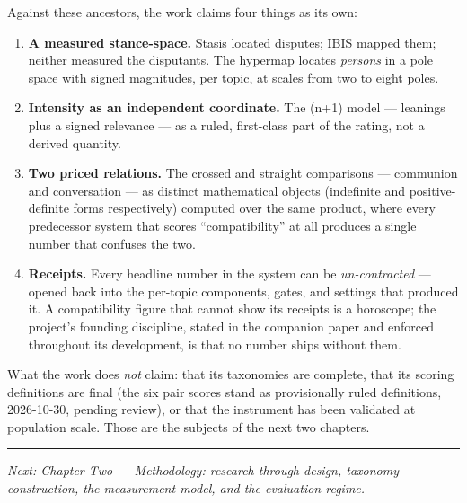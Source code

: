 Against these ancestors, the work claims four things as its own:

\begin{enumerate}
\def\labelenumi{\arabic{enumi}.}
\tightlist
\item
  \textbf{A measured stance-space.} Stasis located disputes; IBIS mapped
  them; neither measured the disputants. The hypermap locates
  \emph{persons} in a pole space with signed magnitudes, per topic, at
  scales from two to eight poles.
\item
  \textbf{Intensity as an independent coordinate.} The (n+1) model ---
  leanings plus a signed relevance --- as a ruled, first-class part of
  the rating, not a derived quantity.
\item
  \textbf{Two priced relations.} The crossed and straight comparisons
  --- communion and conversation --- as distinct mathematical objects
  (indefinite and positive-definite forms respectively) computed over
  the same product, where every predecessor system that scores
  ``compatibility'' at all produces a single number that confuses the
  two.
\item
  \textbf{Receipts.} Every headline number in the system can be
  \emph{un-contracted} --- opened back into the per-topic components,
  gates, and settings that produced it. A compatibility figure that
  cannot show its receipts is a horoscope; the project's founding
  discipline, stated in the companion paper and enforced throughout its
  development, is that no number ships without them.
\end{enumerate}

What the work does \emph{not} claim: that its taxonomies are complete,
that its scoring definitions are final (the six pair scores stand as
provisionally ruled definitions, 2026-10-30, pending review), or that
the instrument has been validated at population scale. Those are the
subjects of the next two chapters.

\begin{center}\rule{0.5\linewidth}{0.5pt}\end{center}

\emph{Next: Chapter Two --- Methodology: research through design,
taxonomy construction, the measurement model, and the evaluation
regime.}

